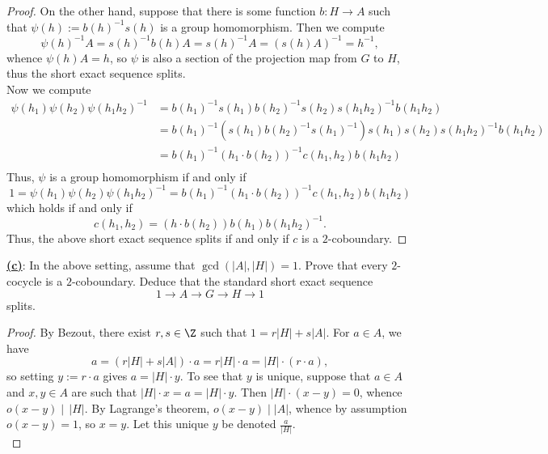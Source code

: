 \documentclass[12pt]{article}
\begin{document}
\begin{homeworkProblem}
\begin{proof}
    On the other hand, suppose that there is some function $ b: H\to A$ such that $ \psi(h):=b(h)^{-1}s(h) $ is a group homomorphism. Then we compute
    \[
      \psi(h)^{-1}A = s(h)^{-1}b(h) A = s(h)^{-1} A = (s(h)A)^{-1} = h^{-1},
    \]
    whence $ \psi(h) A = h$, so $ \psi $ is also a section of the projection map from $ G $ to $ H $, thus the short exact sequence splits.\\

    Now we compute 
    \begin{align*}
      \psi(h_{1}) \psi(h_{2}) \psi(h_{1}h_{2})^{-1} &= b(h_{1})^{-1}s(h_{1}) b(h_{2})^{-1}s(h_{2}) s(h_{1}h_{2})^{-1}b(h_{1}h_{2})\\
      &=b(h_{1})^{-1}(s(h_{1}) b(h_{2})^{-1}s(h_{1})^{-1})s(h_{1})s(h_{2}) s(h_{1}h_{2})^{-1}b(h_{1}h_{2})\\
      &=b(h_{1})^{-1}(h_{1}\cdot b(h_{2}))^{-1}c(h_{1},h_{2})b(h_{1}h_{2})\\
    \end{align*}
    Thus, $ \psi $ is a group homomorphism if and only if
    \[
      1 = \psi(h_{1}) \psi(h_{2}) \psi(h_{1}h_{2})^{-1} = b(h_{1})^{-1}(h_{1}\cdot b(h_{2}))^{-1}c(h_{1},h_{2})b(h_{1}h_{2})
    \]
    which holds if and only if 
    \[
      c(h_{1},h_{2}) = (h\cdot b(h_{2})) b(h_{1}) b(h_{1}h_{2})^{-1}.
    \]
    Thus, the above short exact sequence splits if and only if $ c $ is a $ 2 $-coboundary.
    
  \end{proof}

  \underline{\textbf{(c)}}: In the above setting, assume that $\gcd(\lvert A\rvert, \lvert H\rvert) = 1$.  
  Prove that every $2$-cocycle is a $2$-coboundary. Deduce that the standard short exact sequence
  \[
    1 \to A \to G \to H \to 1
  \]
  splits.

  \begin{proof}
    By Bezout, there exist $ r,s\in\Z $  such that $ 1 = r|H|+ s|A| $. For $ a\in A $, we have 
    \[
      a = (r|H|+s|A|)\cdot a = r|H|\cdot a = |H|\cdot (r\cdot a),
    \]
    so setting $ y:=r\cdot a $ gives $ a = |H|\cdot y $. To see that $ y $ is unique, suppose that $ a\in A $ and $ x,y\in A $ are such that $ |H|\cdot x = a = |H|\cdot y $. Then $ |H|\cdot (x-y) = 0 $, whence $ o(x-y)\mid\, |H| $. By Lagrange's theorem, $ o(x-y)\mid |A| $, whence by assumption $ o(x-y)=1 $, so $ x=y $. Let this unique $ y $ be denoted $ \frac{a}{|H|} $.\\


\end{proof}
\end{homeworkProblem}
\end{document}

